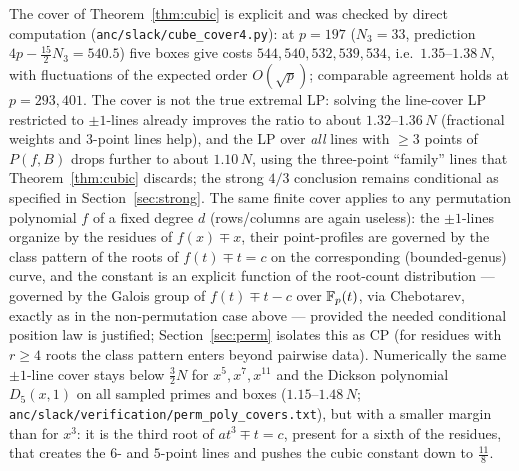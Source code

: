 \begin{remark}
The cover of Theorem~\ref{thm:cubic} is explicit and was checked by direct computation
(\texttt{anc/slack/cube\_cover4.py}): at $p=197$ ($N_3=33$, prediction $4p-\tfrac{15}2N_3=540.5$) five boxes give costs
$544,540,532,539,534$, i.e.\ $1.35$--$1.38\,N$, with fluctuations of the expected order $O(\sqrt p)$; comparable
agreement holds at $p=293,401$. The cover is not the true extremal LP: solving the line-cover LP restricted to
$\pm1$-lines already improves the ratio to about $1.32$--$1.36\,N$ (fractional weights and $3$-point lines help),
and the LP over \emph{all} lines with $\ge3$ points of $P(f,B)$ drops further to about $1.10\,N$, using the
three-point ``family'' lines that Theorem~\ref{thm:cubic} discards; the strong $4/3$ conclusion remains conditional as specified in Section~\ref{sec:strong}. The same finite cover applies to any permutation polynomial $f$ of a fixed degree $d$ (rows/columns are
again useless): the $\pm1$-lines organize by the residues of $f(x)\mp x$, their point-profiles are governed by the
class pattern of the roots of $f(t)\mp t=c$ on the corresponding (bounded-genus) curve, and the constant is an
explicit function of the root-count distribution — governed by the Galois group of $f(t)\mp t-c$ over $\mathbb{F}_p(t)$, via
Chebotarev, exactly as in the non-permutation case above — provided the needed conditional position law is justified; Section~\ref{sec:perm} isolates this as CP (for residues with $r\ge4$ roots the class pattern enters beyond
pairwise data). Numerically the same $\pm1$-line cover stays below $\tfrac32N$ for $x^5,x^7,x^{11}$ and the Dickson
polynomial $D_5(x,1)$ on all sampled primes and boxes ($1.15$--$1.48\,N$; \texttt{anc/slack/verification/perm\_poly\_covers.txt}),
but with a smaller margin than for $x^3$: it is the third root of $at^3\mp t=c$, present for a sixth of the residues, that
creates the $6$- and $5$-point lines and pushes the cubic constant down to $\tfrac{11}8$.
\end{remark}

